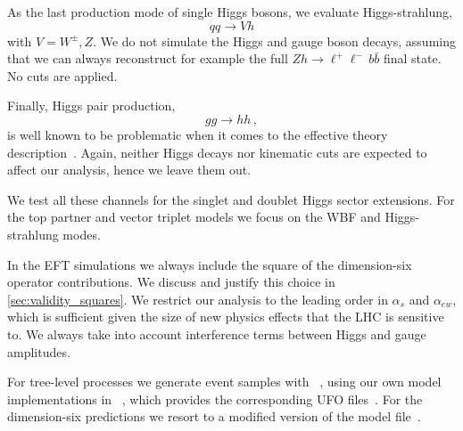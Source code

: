 As the last production mode of single Higgs bosons, we evaluate
Higgs-strahlung,
%
\begin{equation}
  q q \to V h
\end{equation}
%
with $V = W^\pm, Z$. We do not simulate the Higgs and gauge boson
decays, assuming that we can always reconstruct for example the full
$Zh \to \ell^+ \ell^- \, b \bar{b}$ final state. No cuts are applied.

Finally, Higgs pair production,
%
\begin{equation}
  g g \to h h \,,
\end{equation}
%
is well known to be problematic when it comes to the effective theory
description~\cite{Baur:2002rb, Gillioz:2012se, Dawson:2012mk}. Again,
neither Higgs decays nor kinematic cuts are expected to affect our
analysis, hence we leave them out.

\newparagraph
%
We test all these channels for the singlet and doublet Higgs sector
extensions. For the top partner and vector triplet models we focus on
the WBF and Higgs-strahlung modes.

In the EFT simulations we always include the square of the
dimension-six operator contributions. We discuss and
justify this choice in \autoref{sec:validity_squares}.
%
%
We restrict our analysis to the leading order in $\alpha_s$ and
$\alpha_{ew}$, which is sufficient given the size of new physics
effects that the LHC is sensitive to. We always take into account
interference terms between Higgs and gauge amplitudes.

For tree-level processes we generate event samples with
~\cite{Alwall:2014hca}, using our own model
implementations in ~\cite{Alloul:2013bka}, which
provides the corresponding UFO files~\cite{Degrande:2011ua}.  For the
dimension-six predictions we resort to a modified version of the
 model file~\cite{Alloul:2013naa}.

